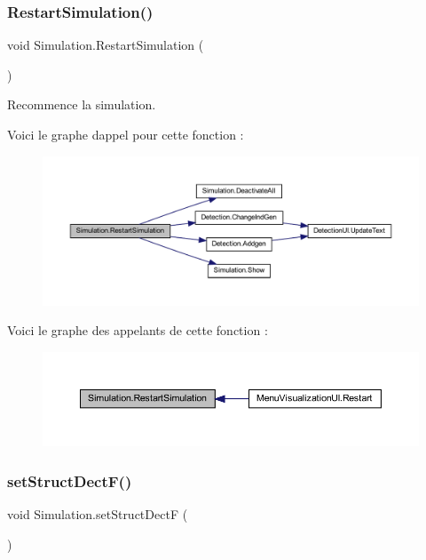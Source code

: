 \subsubsection{\texorpdfstring{Restart\+Simulation()}{RestartSimulation()}}
{\footnotesize\ttfamily void Simulation.\+Restart\+Simulation (\begin{DoxyParamCaption}{ }\end{DoxyParamCaption})\hspace{0.3cm}{\ttfamily [inline]}}



Recommence la simulation. 

Voici le graphe d\textquotesingle{}appel pour cette fonction \+:
\nopagebreak
\begin{figure}[H]
\begin{center}
\leavevmode
\includegraphics[width=350pt]{class_simulation_a500982098740ae238f349a6fed0affd8_cgraph}
\end{center}
\end{figure}
Voici le graphe des appelants de cette fonction \+:
\nopagebreak
\begin{figure}[H]
\begin{center}
\leavevmode
\includegraphics[width=350pt]{class_simulation_a500982098740ae238f349a6fed0affd8_icgraph}
\end{center}
\end{figure}
\mbox{\label{class_simulation_a93ab4fa0107498061196ce3a051d292d}} 
\subsubsection{\texorpdfstring{set\+Struct\+Dect\+F()}{setStructDectF()}}
{\footnotesize\ttfamily void Simulation.\+set\+Struct\+DectF (\begin{DoxyParamCaption}{ }\end{DoxyParamCaption})\hspace{0.3cm}{\ttfamily [inline]}}

